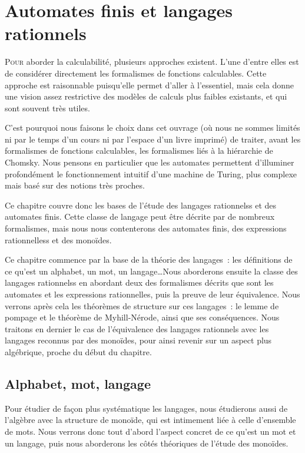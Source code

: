 \chapter[Langages rationnels]{Automates finis et langages rationnels}
\label{chp.auto}

\minitoc

\lettrine{P}{our} aborder la calculabilité, plusieurs approches existent. L'une
d'entre elles est de considérer directement les formalismes de fonctions
calculables. Cette approche est raisonnable puisqu'elle permet d'aller à
l'essentiel, mais cela donne une vision assez restrictive des modèles de calculs
plus faibles existants, et qui sont souvent très utiles.

C'est pourquoi nous faisons le choix dans cet ouvrage (où nous ne sommes limités
ni par le temps d'un cours ni par l'espace d'un livre imprimé) de traiter, avant
les formalismes de fonctions calculables, les formalismes liés à la hiérarchie
de Chomsky. Nous pensons en particulier que les automates permettent d'illuminer
profondément le fonctionnement intuitif d'une machine de Turing, plus complexe
mais basé sur des notions très proches.

Ce chapitre couvre donc les bases de l'étude des langages rationnelss et des
automates finis. Cette classe de langage peut être décrite par de nombreux
formalismes, mais nous nous contenterons des automates finis, des expressions
rationnelless et des monoïdes.

Ce chapitre commence par la base de la théorie des langages~: les définitions
de ce qu'est un alphabet, un mot, un langage\ldots Nous aborderons ensuite la
classe des langages rationnelss en abordant deux des formalismes décrits que
sont les automates et les expressions rationnelles, puis la preuve de
leur équivalence. Nous verrons après cela les théorèmes de structure sur ces
langages~: le lemme de pompage et le théorème de Myhill-Nérode, ainsi que ses
conséquences. Nous traitons en dernier le cas de l'équivalence des langages
rationnels avec les langages reconnus par des monoïdes, pour ainsi revenir sur
un aspect plus algébrique, proche du début du chapitre.

\section{Alphabet, mot, langage}

Pour étudier de façon plus systématique les langages, nous étudierons aussi de
l'algèbre avec la structure de monoïde, qui est intimement liée à celle
d'ensemble de mots. Nous verrons donc tout d'abord l'aspect concret de ce qu'est
un mot et un langage, puis nous aborderons les côtés théoriques de l'étude des
monoïdes.

